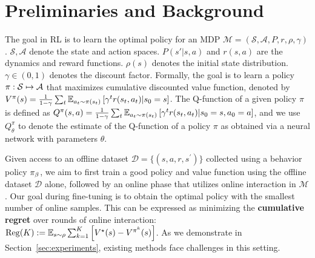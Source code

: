 \vspace{-0.2cm}
\section{Preliminaries and Background}
\vspace{-0.15cm}
The goal in RL is to learn the optimal policy for an MDP $\mathcal{M} = (\mathcal{S}, \mathcal{A}, P, r, \rho, \gamma)$. $\mathcal{S}, \mathcal{A}$ denote the state and action spaces.  $P(s' | s, a)$ and $r(s,a)$
are the dynamics and reward functions. $\rho(s)$ denotes the initial state distribution.  $\gamma \in (0,1)$ denotes the discount factor. Formally, the goal is to learn a policy $\pi:\mathcal S\mapsto \mathcal A$ that maximizes cumulative discounted value function, denoted by $V^\pi(s) = {\frac{1}{1-\gamma}\sum_{t} \mathbb E_{a_t \sim \pi(s_t)}\left[ \gamma^t r(s_t, a_t)|s_0=s \right]}$. The Q-function of a given policy $\pi$ is defined as ${Q^\pi(s,a) = {\frac{1}{1-\gamma}\sum_{t} \mathbb E_{a_t \sim \pi(s_t)}\left[ \gamma^t r(s_t, a_t)|s_0=s,a_0=a \right]}}$, and we use $Q_\theta^\pi$ to denote the estimate of the Q-function of a policy $\pi$ as obtained via a neural network with parameters $\theta$.

Given access to an offline dataset $\mathcal{D} = \{(s, a, r, s^\prime)\}$ collected using a behavior policy ${\pi_\beta}$, we aim to first train a good policy and value function using the offline dataset $\mathcal{D}$ alone, followed by an online phase that utilizes online interaction in $\mathcal{M}$. Our goal during fine-tuning is to obtain the optimal policy with the smallest number of online samples. This can be expressed as minimizing the \textbf{cumulative regret} over rounds of online interaction: $\mathrm{Reg}(K) := \mathbb E_{s\sim \rho}\sum_{k=1}^K\left[ V^{\star}(s) - V^{\pi^k}(s) \right]$. As we demonstrate in Section~\ref{sec:experiments}, existing methods face challenges in this setting.

